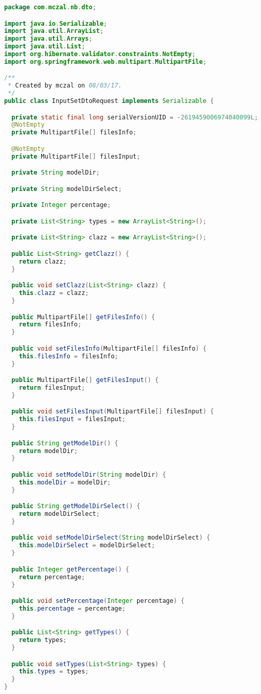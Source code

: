 \begin{lstlisting}[language=Java,basicstyle=\tiny,caption=InputSetDtoRequest.java]
package com.mczal.nb.dto;

import java.io.Serializable;
import java.util.ArrayList;
import java.util.Arrays;
import java.util.List;
import org.hibernate.validator.constraints.NotEmpty;
import org.springframework.web.multipart.MultipartFile;

/**
 * Created by mczal on 08/03/17.
 */
public class InputSetDtoRequest implements Serializable {

  private static final long serialVersionUID = -2619459006974040099L;
  @NotEmpty
  private MultipartFile[] filesInfo;

  @NotEmpty
  private MultipartFile[] filesInput;

  private String modelDir;

  private String modelDirSelect;

  private Integer percentage;

  private List<String> types = new ArrayList<String>();

  private List<String> clazz = new ArrayList<String>();

  public List<String> getClazz() {
    return clazz;
  }

  public void setClazz(List<String> clazz) {
    this.clazz = clazz;
  }

  public MultipartFile[] getFilesInfo() {
    return filesInfo;
  }

  public void setFilesInfo(MultipartFile[] filesInfo) {
    this.filesInfo = filesInfo;
  }

  public MultipartFile[] getFilesInput() {
    return filesInput;
  }

  public void setFilesInput(MultipartFile[] filesInput) {
    this.filesInput = filesInput;
  }

  public String getModelDir() {
    return modelDir;
  }

  public void setModelDir(String modelDir) {
    this.modelDir = modelDir;
  }

  public String getModelDirSelect() {
    return modelDirSelect;
  }

  public void setModelDirSelect(String modelDirSelect) {
    this.modelDirSelect = modelDirSelect;
  }

  public Integer getPercentage() {
    return percentage;
  }

  public void setPercentage(Integer percentage) {
    this.percentage = percentage;
  }

  public List<String> getTypes() {
    return types;
  }

  public void setTypes(List<String> types) {
    this.types = types;
  }
}

\end{lstlisting}


